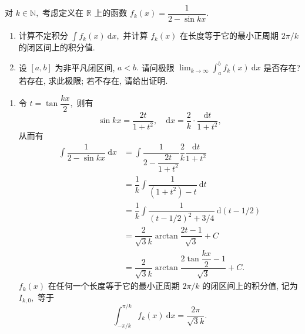 \begin{question}[points = 12]
对 $k \in \mathbb{N},$ 考虑定义在 $\mathbb{R}$ 上的函数 $\displaystyle f_k(x) = \dfrac{1}{2 - \sin kx}.$
\begin{enumerate}
\item 计算不定积分 $\displaystyle \int f_k(x) ~ \mathrm{d} x,$ 并计算 $f_k(x)$ 在长度等于它的最小正周期 $2\pi/k$ 的闭区间上的积分值.
\item 设 $[a, b]$ 为非平凡闭区间, $a < b.$ 请问极限 $\displaystyle \lim_{k\to\infty} \int_a^b f_k(x) ~ \mathrm{d} x$ 是否存在? 若存在, 求此极限; 若不存在, 请给出证明.
\end{enumerate}

\end{question}

\begin{solution}
\begin{enumerate}
\item 令 $t = \tan \dfrac{kx}{2},$ 则有
\begin{equation*}
\sin kx = \dfrac{2t}{1 + t^2}, \quad \mathrm{d} x = \dfrac{2}{k} \cdot \dfrac{\mathrm{d} t}{1 + t^2},
\end{equation*}
从而有
\begin{equation*}
\begin{aligned}
\int \dfrac{1}{2 - \sin kx} ~ \mathrm{d} x & = \int \dfrac{1}{2 - \dfrac{2t}{1 + t^2}} \dfrac{2}{k} \dfrac{\mathrm{d} t}{1 + t^2} \\
& = \dfrac{1}{k} \int \dfrac{1}{(1 + t^2) - t} ~ \mathrm{d} t \\
& = \dfrac{1}{k} \int \dfrac{1}{(t - 1/2)^2 + 3/4} ~ \mathrm{d} (t - 1/2) \\
& = \dfrac{2}{\sqrt{3} k} \arctan \dfrac{2t - 1}{\sqrt{3}} + C \\
& = \dfrac{2}{\sqrt{3} k} \arctan \dfrac{2 \tan \dfrac{kx}{2} - 1}{\sqrt{3}} + C.
\end{aligned}
\end{equation*}
$f_k(x)$ 在任何一个长度等于它的最小正周期 $2\pi/k$ 的闭区间上的积分值, 记为 $I_{k, 0},$ 等于
\begin{equation*}
\int_{-\pi/k}^{\pi/k} f_k(x) ~ \mathrm{d} x = \dfrac{2\pi}{\sqrt{3} k}.
\end{equation*}


\end{enumerate}
\end{solution}
